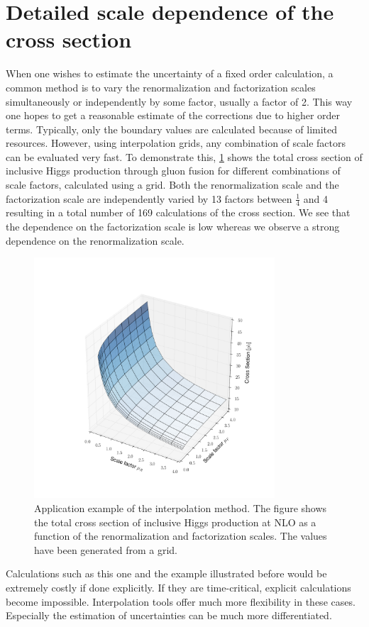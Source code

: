 \section{Detailed scale dependence of the cross section}
When one wishes to estimate the uncertainty of a fixed order calculation, a common method is to vary the renormalization and factorization scales simultaneously or independently by some factor, usually a factor of 2.
This way one hopes to get a reasonable estimate of the corrections due to higher order terms.
Typically, only the boundary values are calculated because of limited resources.
However, using interpolation grids, any combination of scale factors can be evaluated very fast.
To demonstrate this, \cref{fig:3dscale} shows the total cross section of inclusive Higgs production through gluon fusion for different combinations of scale factors, calculated using a \fnlo{} grid.
Both the renormalization scale and the factorization scale are independently varied by 13 factors between $\frac{1}{4}$ and \num{4} resulting in a total number of 169 calculations of the cross section.
We see that the dependence on the factorization scale is low whereas we observe a strong dependence on the renormalization scale.
%
\begin{figure}
	\centering
	\includegraphics[width=0.8\textwidth]{images/3dscale.pdf}
	\caption{Application example of the interpolation method.
			The figure shows the total cross section of inclusive Higgs production at NLO as a function of the renormalization and factorization scales.
			The values have been generated from a \fnlo{} grid.}
	\label{fig:3dscale}
\end{figure}
%

Calculations such as this one and the example illustrated before would be extremely costly if done explicitly.
If they are time-critical, explicit calculations become impossible.
Interpolation tools offer much more flexibility in these cases.
Especially the estimation of uncertainties can be much more differentiated.
